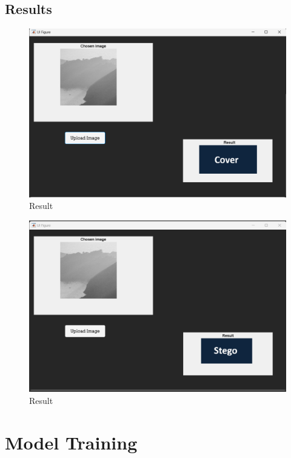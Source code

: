 \subsection{Results}
\begin{figure}[H]
    \centering
    \includegraphics[width=140mm]{./img/resultGrayCover.png}
    \caption{Result}
\end{figure}
\begin{figure}[H]
    \centering
    \includegraphics[width=140mm]{./img/resultGrayStego.png}
    \caption{Result}
\end{figure}

\section{Model Training}
